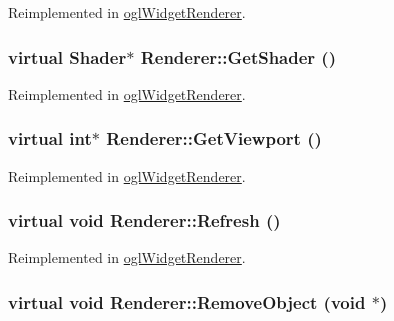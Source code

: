 Reimplemented in \hyperlink{classogl_widget_renderer_3c01888abac427988413194909e3e036}{oglWidgetRenderer}.\hypertarget{class_renderer_85ce8b768250bd767b019f8283a9d46b}{
\subsubsection[{GetShader}]{\setlength{\rightskip}{0pt plus 5cm}virtual {\bf Shader}$\ast$ Renderer::GetShader ()}}
\label{class_renderer_85ce8b768250bd767b019f8283a9d46b}




Reimplemented in \hyperlink{classogl_widget_renderer_43b18c582c133e5fab2c8ce7e3c68033}{oglWidgetRenderer}.\hypertarget{class_renderer_9a93f4e3bad254923c0dc2810e658dd6}{
\subsubsection[{GetViewport}]{\setlength{\rightskip}{0pt plus 5cm}virtual int$\ast$ Renderer::GetViewport ()}}
\label{class_renderer_9a93f4e3bad254923c0dc2810e658dd6}




Reimplemented in \hyperlink{classogl_widget_renderer_64dc363e1e2cc2393ff8ec635b77bd99}{oglWidgetRenderer}.\hypertarget{class_renderer_025a064cb583ac6677a4b9a6099e0378}{
\subsubsection[{Refresh}]{\setlength{\rightskip}{0pt plus 5cm}virtual void Renderer::Refresh ()}}
\label{class_renderer_025a064cb583ac6677a4b9a6099e0378}




Reimplemented in \hyperlink{classogl_widget_renderer_098ec7e24496346f9978e6ce03b079ed}{oglWidgetRenderer}.\hypertarget{class_renderer_28f5bf024a4772cff537683690f62f42}{
\subsubsection[{RemoveObject}]{\setlength{\rightskip}{0pt plus 5cm}virtual void Renderer::RemoveObject (void $\ast$)}}
\label{class_renderer_28f5bf024a4772cff537683690f62f42}




